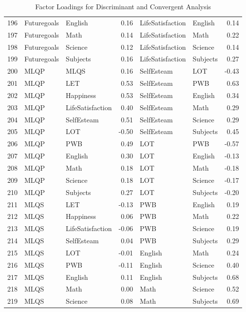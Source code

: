 \documentclass{article}\usepackage[]{graphicx}\usepackage[]{color}
\begin{document}
\begin{table}[ht]
\begin{tabular}{rllrllr}
  196 & Futuregoals & English & 0.16 & LifeSatisfaction & English & 0.14 \\ 
  197 & Futuregoals & Math & 0.14 & LifeSatisfaction & Math & 0.22 \\ 
  198 & Futuregoals & Science & 0.12 & LifeSatisfaction & Science & 0.14 \\ 
  199 & Futuregoals & Subjects & 0.16 & LifeSatisfaction & Subjects & 0.27 \\ 
  200 & MLQP & MLQS & 0.16 & SelfEsteam & LOT & -0.43 \\ 
  201 & MLQP & LET & 0.53 & SelfEsteam & PWB & 0.63 \\ 
  202 & MLQP & Happiness & 0.53 & SelfEsteam & English & 0.34 \\ 
  203 & MLQP & LifeSatisfaction & 0.40 & SelfEsteam & Math & 0.29 \\ 
  204 & MLQP & SelfEsteam & 0.51 & SelfEsteam & Science & 0.29 \\ 
  205 & MLQP & LOT & -0.50 & SelfEsteam & Subjects & 0.45 \\ 
  206 & MLQP & PWB & 0.49 & LOT & PWB & -0.57 \\ 
  207 & MLQP & English & 0.30 & LOT & English & -0.13 \\ 
  208 & MLQP & Math & 0.18 & LOT & Math & -0.18 \\ 
  209 & MLQP & Science & 0.18 & LOT & Science & -0.17 \\ 
  210 & MLQP & Subjects & 0.27 & LOT & Subjects & -0.20 \\ 
  211 & MLQS & LET & -0.13 & PWB & English & 0.19 \\ 
  212 & MLQS & Happiness & 0.06 & PWB & Math & 0.22 \\ 
  213 & MLQS & LifeSatisfaction & -0.06 & PWB & Science & 0.19 \\ 
  214 & MLQS & SelfEsteam & 0.04 & PWB & Subjects & 0.29 \\ 
  215 & MLQS & LOT & -0.01 & English & Math & 0.24 \\ 
  216 & MLQS & PWB & -0.11 & English & Science & 0.40 \\ 
  217 & MLQS & English & 0.11 & English & Subjects & 0.68 \\ 
  218 & MLQS & Math & 0.00 & Math & Science & 0.52 \\ 
  219 & MLQS & Science & 0.08 & Math & Subjects & 0.69 \\ 
   \hline
\end{tabular}
\caption{Factor Loadings for Discriminant and Convergent Analysis} 
\end{table}
\end{document}
